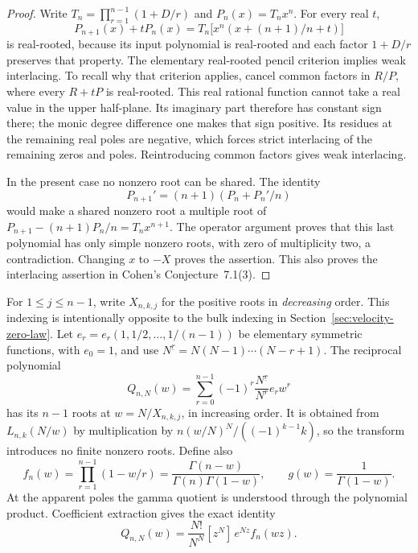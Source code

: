 \documentclass[11pt]{article}
\numberwithin{equation}{section}
\theoremstyle{definition}
\theoremstyle{remark}
\begin{document}
\begin{proof}
Write $T_n=\prod_{r=1}^{n-1}(1+D/r)$ and $P_n(x)=T_nx^n$.
For every real $t$,
\[
 P_{n+1}(x)+tP_n(x)
    =T_n\bigl[x^n(x+(n+1)/n+t)\bigr]
\]
is real-rooted, because its input polynomial is real-rooted and
each factor $1+D/r$ preserves that property.  The elementary
real-rooted pencil criterion implies weak interlacing.
To recall why that criterion applies, cancel common factors in
$R/P$, where every $R+tP$ is real-rooted.  This real rational
function cannot take a real value in the upper half-plane.  Its
imaginary part therefore has constant sign there; the monic degree
difference one makes that sign positive.  Its residues at the
remaining real poles are negative, which forces strict interlacing
of the remaining zeros and poles.  Reintroducing common factors
gives weak interlacing.

In the present case no nonzero root can be shared.  The identity
\[
 P_{n+1}'=(n+1)(P_n+P_n'/n)
\]
would make a shared nonzero root a multiple root of
$P_{n+1}-(n+1)P_n/n=T_nx^{n+1}$.  The operator argument proves that
this last polynomial has only simple nonzero roots, with zero
of multiplicity two, a contradiction.  Changing $x$ to $-X$
proves the assertion.  This also proves the interlacing assertion
in Cohen's Conjecture~7.1(3).
\end{proof}

For $1\leq j\leq n-1$, write $X_{n,k,j}$ for the positive roots in
\emph{decreasing} order.  This indexing is intentionally opposite to
the bulk indexing in Section~\ref{sec:velocity-zero-law}.
Let $e_r=e_r(1,1/2,\ldots,1/(n-1))$ be elementary symmetric functions,
with $e_0=1$, and use $N^{\underline r}=N(N-1)\cdots(N-r+1)$.
The reciprocal polynomial
\begin{equation}\label{eq:reciprocal-lambert-polynomial}
 Q_{n,N}(w)=\sum_{r=0}^{n-1}(-1)^r
       \frac{N^{\underline r}}{N^r}e_r w^r
\end{equation}
has its $n-1$ roots at $w=N/X_{n,k,j}$, in increasing order.
It is obtained from $L_{n,k}(N/w)$ by multiplication by
$n(w/N)^N/((-1)^{k-1}k)$, so the transform introduces no finite
nonzero roots.  Define also
\begin{equation}\label{eq:gamma-product-fn}
 f_n(w)=\prod_{r=1}^{n-1}(1-w/r)
       =\frac{\Gamma(n-w)}{\Gamma(n)\Gamma(1-w)},\qquad
 g(w)=\frac1{\Gamma(1-w)}.
\end{equation}
At the apparent poles the gamma quotient is understood through the
polynomial product.  Coefficient extraction gives the exact identity
\begin{equation}\label{eq:reciprocal-coefficient-integral}
 Q_{n,N}(w)=\frac{N!}{N^N}[z^N]\,e^{Nz}f_n(wz).
\end{equation}
\end{document}
